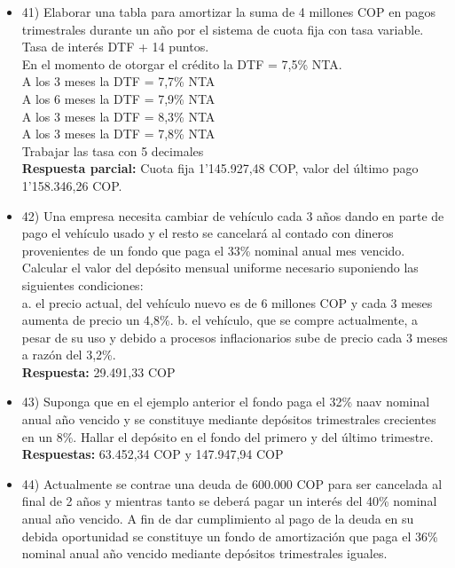 \begin{itemize}
       \textbf{Respuesta parcial:} el valor de los pagos será: 270.000 COP, 243.000 COP, 216.000 COP, 175.500 COP, 135.000 COP, 67.500 COP
       \medskip

 \item 41)  Elaborar una tabla para amortizar la suma de 4 millones COP en pagos trimestrales durante un año por el sistema de cuota fija con tasa variable. Tasa de interés DTF + 14 puntos. \\

       En el momento de otorgar el crédito la DTF = 7,5\% NTA.\\

       A los 3 meses la DTF = 7,7\% NTA\\
       A los 6 meses la DTF = 7,9\% NTA \\
       A los 3 meses la DTF = 8,3\% NTA \\
       A los 3 meses la DTF = 7,8\% NTA\\
       Trabajar las tasa con 5 decimales\\
       \textbf{Respuesta parcial:} Cuota fija 1'145.927,48 COP, valor del último pago 1'158.346,26 COP.
       \medskip

 \item 42)  Una empresa necesita cambiar de vehículo cada 3 años dando en parte de pago el vehículo usado y el resto se cancelará al contado con dineros provenientes de un fondo que paga el 33\%  nominal anual mes vencido. Calcular el valor del depósito mensual uniforme necesario suponiendo las siguientes condiciones: \\

       a.	el precio actual, del vehículo nuevo es de 6 millones COP y cada 3 meses aumenta de precio un 4,8\%.
       b.	el vehículo, que se compre actualmente, a pesar de su uso y debido a procesos inflacionarios sube de precio cada 3 meses a razón del 3,2\%.\\
       \textbf{Respuesta:} 29.491,33 COP
       \medskip

 \item 43) Suponga que en el ejemplo anterior el fondo paga el 32\% naav nominal anual año vencido y se constituye mediante depósitos trimestrales crecientes en un 8\%. Hallar el depósito en el fondo del primero y del último trimestre.\\
       \textbf{Respuestas:} 63.452,34 COP y 147.947,94 COP
       \medskip

 \item 44)  Actualmente se contrae una deuda de 600.000 COP para ser cancelada al final de 2 años y mientras tanto se deberá pagar un interés del 40\% nominal anual año vencido. A fin de dar cumplimiento al pago de la deuda en su debida oportunidad se constituye un fondo de amortización que paga el 36\% nominal anual año vencido mediante depósitos trimestrales iguales. \\


\end{itemize}
